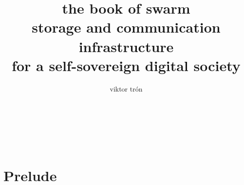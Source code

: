 \documentclass[12pt,openright,hyperfootnotes,hidelinks]{book}
\title{\Huge\sc the book of swarm\\\vskip10pt
\large storage and communication infrastructure\\\vskip-3pt for a self-sovereign digital society\\\vskip10pt}
\author{\sc viktor tr{\'o}n}
\date{}
\newif\ifdraft
\begin{document}
\frontmatter
\maketitle
\ifdraft
Instructions for compiling and distributing.

These are hidden if conditional text is not shown (when publishing a version).

\begin{enumerate}[noitemsep]
    \item any version being worked on should be named "Version vX - worked on";
    \item when publishing, "worked on" should be removed; 
    \item drafttrue line should be commented out removing conditional text upon compilation;
    \item PDF should be generated, saved and pushed to Github repo \\ (https://github.com/ethersphere/publish-bookofswarm/tree/master/pdfs); 
    \item verify that last commit was autodeployed to Swarm \\ (https://swarm-gateways.net/bzz:/latest.bookofswarm.eth/the-book-of-swarm-viktor-tron.pdf);
    \item PDF commit in Github repo should be named with version number;
    \item version number in Latex should be bumped up and "worked on" note added: "Version v(X+1) - worked on";
    \item Goto 1.
\end{enumerate}
\fi
%
\newpage\pagestyle{empty}\ \newpage

\pagestyle{empty}\ \newpage
\tableofcontents
\listoffigures

\label{sec:toc}
 
\mainmatter
\part{Prelude} 
\label{part:preface}
\pagestyle{fancy}
\fancyhead{} %
\fancyhead[LO]{\leftmark}
\fancyhead[RO]{\thepage}
\fancyhead[LE]{\thepage}
\fancyhead[RE]{\leftmark} %
\fancyfoot{}

\end{document}
